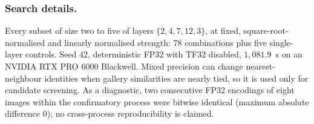 \subsubsection*{Search details.}
Every subset of size two to five of layers $\{2,4,7,12,3\}$, at fixed,
square-root-normalised and linearly normalised strength: $78$ combinations plus
five single-layer controls. Seed $42$, deterministic FP32 with TF32 disabled,
$1{,}081.9$~s on an NVIDIA RTX PRO 6000 Blackwell. Mixed precision can change
nearest-neighbour identities when gallery similarities are nearly tied, so it
is used only for candidate screening. As a diagnostic, two
consecutive FP32 encodings of eight images within the confirmatory process were
bitwise identical (maximum absolute difference $0$); no cross-process
reproducibility is claimed.

